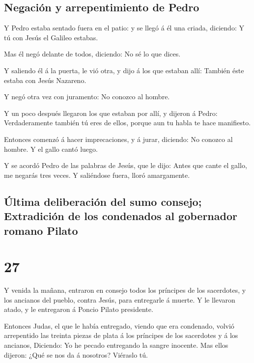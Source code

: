 \hypertarget{negaciuxf3n-y-arrepentimiento-de-pedro}{%
\subsection{Negación y arrepentimiento de
Pedro}\label{negaciuxf3n-y-arrepentimiento-de-pedro}}

 Y Pedro estaba sentado fuera en el patio: y se llegó á
él una criada, diciendo: Y tú con Jesús el Galileo estabas.

 Mas él negó delante de todos, diciendo: No sé lo que
dices.

 Y saliendo él á la puerta, le vió otra, y dijo á los que
estaban allí: También éste estaba con Jesús Nazareno.

 Y negó otra vez con juramento: No conozco al hombre.

 Y un poco después llegaron los que estaban por allí, y
dijeron á Pedro: Verdaderamente también tú eres de ellos, porque aun tu
habla te hace manifiesto.

 Entonces comenzó á hacer imprecaciones, y á jurar,
diciendo: No conozco al hombre. Y el gallo cantó luego.

 Y se acordó Pedro de las palabras de Jesús, que le dijo:
Antes que cante el gallo, me negarás tres veces. Y saliéndose fuera,
lloró amargamente.

\hypertarget{uxfaltima-deliberaciuxf3n-del-sumo-consejo-extradiciuxf3n-de-los-condenados-al-gobernador-romano-pilato}{%
\subsection{Última deliberación del sumo consejo; Extradición de los
condenados al gobernador romano
Pilato}\label{uxfaltima-deliberaciuxf3n-del-sumo-consejo-extradiciuxf3n-de-los-condenados-al-gobernador-romano-pilato}}

\hypertarget{section-40-27}{%
\section{27}\label{section-40-27}}

 Y venida la mañana, entraron en consejo todos los
príncipes de los sacerdotes, y los ancianos del pueblo, contra Jesús,
para entregarle á muerte.  Y le llevaron atado, y le
entregaron á Poncio Pilato presidente.

 Entonces Judas, el que le había entregado, viendo que era
condenado, volvió arrepentido las treinta piezas de plata á los
príncipes de los sacerdotes y á los ancianos,  Diciendo:
Yo he pecado entregando la sangre inocente. Mas ellos dijeron: ¿Qué se
nos da á nosotros? Viéraslo tú.

